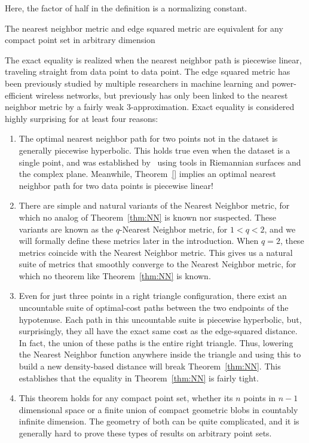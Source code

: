 Here, the factor of half in the definition is a normalizing constant.

\begin{theorem}\label{thm:NN} The nearest neighbor metric and edge squared
metric are equivalent for any compact point set in arbitrary dimension
\end{theorem}

The exact equality is realized when the nearest neighbor path is piecewise
linear, traveling straight from data point to data point. The edge squared
metric has been previously studied by multiple researchers in machine
learning and power-efficient wireless networks, but previously has only
been linked to the nearest neighbor metric by a fairly weak
3-approximation. Exact equality is considered highly surprising for at
least four reasons:

\begin{enumerate}

\item The optimal nearest neighbor path for two points not in the dataset
is generally piecewise hyperbolic. This holds true even when the
dataset is a single point, and was established by~\cite{}
using tools in Riemannian surfaces and the complex plane.
Meanwhile, Theorem~\ref{} implies an optimal nearest
neighbor path for two data points is piecewise linear!

\item There are simple and natural variants of the Nearest Neighbor metric,
for which no analog of Theorem~\ref{thm:NN} is known nor suspected.
These variants are known as the $q$-Nearest Neighbor
metric, for $1 < q < 2$, and we will formally define these
metrics later in the introduction. When $q=2$, these
metrics coincide with the Nearest Neighbor metric.
This
gives us a natural suite of metrics that smoothly converge
to the Nearest Neighbor metric, for which no theorem like
Theorem~\ref{thm:NN} is known.

\item Even for just three points in a right triangle configuration, there
exist an uncountable suite of optimal-cost paths between the two
endpoints of the hypotenuse. Each path in this uncountable
suite is piecewise hyperbolic, but, surprisingly, they all
have the exact same cost as the edge-squared distance. In
fact, the union of these paths is the entire right
triangle. Thus, lowering the Nearest Neighbor function
anywhere inside the triangle and using this to build a new
density-based distance will break
Theorem~\ref{thm:NN}. This establishes that the equality in
Theorem~\ref{thm:NN} is fairly tight.

\item This theorem holds for any compact point set, whether its $n$ points
in $n-1$ dimensional space or a finite union of compact geometric
blobs in countably infinite dimension. The geometry of both
can be quite complicated, and it is generally hard to prove
these types of results on arbitrary point sets.

\end{enumerate}

